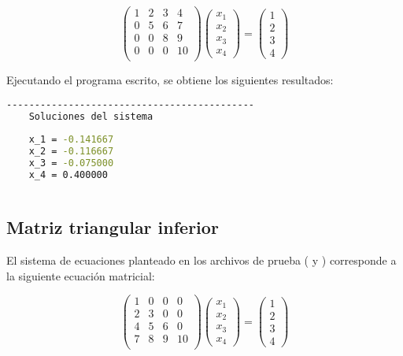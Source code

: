 \begin{equation*}
    \begin{pmatrix}
        1 & 2 & 3 & 4  \\
        0 & 5 & 6 & 7  \\
        0 & 0 & 8 & 9  \\
        0 & 0 & 0 & 10 \\
    \end{pmatrix}
    \begin{pmatrix}
        x_1 \\
        x_2 \\
        x_3 \\
        x_4
    \end{pmatrix} = \begin{pmatrix}
        1 \\
        2 \\
        3 \\
        4
    \end{pmatrix}
\end{equation*}

Ejecutando el programa escrito, se obtiene los siguientes resultados:

\begin{lstlisting}[language=bash]
    --------------------------------------------
    Soluciones del sistema
    
    x_1	= -0.141667
    x_2	= -0.116667
    x_3	= -0.075000
    x_4	= 0.400000
    

\end{lstlisting}

\subsection{Matriz triangular inferior}

El sistema de ecuaciones planteado en los archivos de prueba ( y ) corresponde a la siguiente ecuación matricial:

\begin{equation*}
    \begin{pmatrix}
        1 & 0 & 0 & 0  \\
        2 & 3 & 0 & 0  \\
        4 & 5 & 6 & 0  \\
        7 & 8 & 9 & 10 \\
    \end{pmatrix}
    \begin{pmatrix}
        x_1 \\
        x_2 \\
        x_3 \\
        x_4
    \end{pmatrix} = \begin{pmatrix}
        1 \\
        2 \\
        3 \\
        4
    \end{pmatrix}
\end{equation*}

